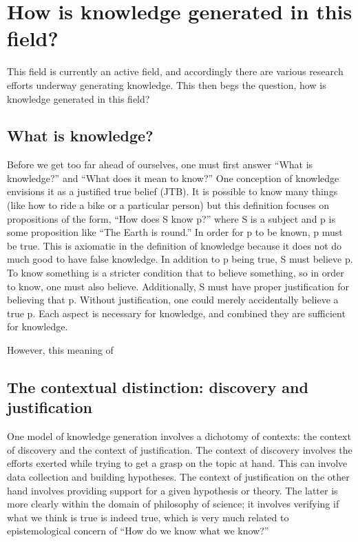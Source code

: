 \documentclass[a4paper]{article}
\begin{document}
\section{How is knowledge generated in this field?}


This field is currently an active field, and accordingly there are various
research efforts underway generating knowledge. This then begs the question,
how is knowledge generated in this field?  

\subsection{What is knowledge?}

Before we get too far ahead of ourselves, one must first answer ``What is
knowledge?'' and ``What does it mean to know?'' One conception of knowledge
envisions it as a justified true belief (JTB). It is possible to know many
things (like how to ride a bike or a particular person) but this definition
focuses on propositions of the form, ``How does S know p?'' where S is a subject
and p is some proposition like ``The Earth is round.'' In order for p to be
known, p must be true. This is axiomatic in the definition of knowledge
because it does not do much good to have false knowledge. In addition to p
being true, S must believe p. To know something is a stricter condition that
to believe something, so in order to know, one must also believe.
Additionally, S must have proper justification for believing that p. Without
justification, one could merely accidentally believe a true p. Each aspect is
necessary for knowledge, and combined they are sufficient for knowledge.

However, this meaning of 

\subsection{The contextual distinction: discovery and justification}

One model of knowledge generation involves a dichotomy of contexts: the
context of discovery and the context of justification. The context of
discovery involves the efforts exerted while trying to get a grasp on the
topic at hand. This can involve data collection and building hypotheses. The
context of justification on the other hand involves providing support for a
given hypothesis or theory. The latter is more clearly within the domain of
philosophy of science; it involves verifying if what we think is true is
indeed true, which is very much related to epistemological concern of ``How do
we know what we know?''
\end{document}
